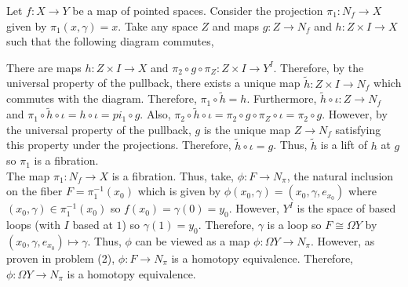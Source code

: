 \documentclass[12pt]{extarticle}
\begin{document}
Let $f : X \to Y$ be a map of pointed spaces. Consider the projection $\pi_1 : N_f \to X$ given by $\pi_1(x, \gamma) = x$. Take any space $Z$ and maps $g : Z \to N_f$ and $h : Z \times I \to X$ such that the following diagram commutes,
\begin{center}
\end{center}
There are maps $h : Z \times I \to X$ and $\pi_2 \circ g \circ \pi_Z : Z \times I \to Y^I$. Therefore, by the universal property of the pullback, there exists a unique map $\tilde{h} : Z \times I \to N_f$ which commutes with the diagram. Therefore, $\pi_1 \circ \tilde{h} = h$. Furthermore, $\tilde{h} \circ \iota : Z \to N_f$ and $\pi_1 \circ \tilde{h} \circ \iota = h \circ \iota = pi_1 \circ g$. Also, $\pi_2 \circ \tilde{h} \circ \iota = \pi_2 \circ g \circ \pi_Z \circ \iota = \pi_2 \circ g$. However, by the universal property of the pullback, $g$ is the unique map $Z \to N_f$ satisfying this property under the projections. Therefore, $\tilde{h} \circ \iota = g$. Thus, $\tilde{h}$ is a lift of $h$ at $g$ so $\pi_1$ is a fibration. \bigskip \\
The map $\pi_1 : N_f \to X$ is a fibration. Thus, take, $\phi : F \to N_\pi$, the natural inclusion on the fiber $F = \pi_1^{-1}(x_0)$ which is given by $\phi(x_0, \gamma) = (x_0, \gamma, e_{x_0})$ where $(x_0, \gamma) \in \pi_1^{-1}(x_0)$ so $f(x_0) = \gamma(0) = y_0$. However, $Y^I$ is the space of based loops (with $I$ based at $1$) so $\gamma(1) = y_0$. Therefore, $\gamma$ is a loop so $F \cong \Omega Y$ by $(x_0, \gamma, e_{x_0}) \mapsto \gamma$. Thus, $\phi$ can be viewed as a map $\phi : \Omega Y \to N_\pi$. However, as proven in problem (2), $\phi : F \to N_\pi$ is a homotopy equivalence. Therefore, $\phi : \Omega Y \to N_\pi$ is a homotopy equivalence. 
 
\end{document}
